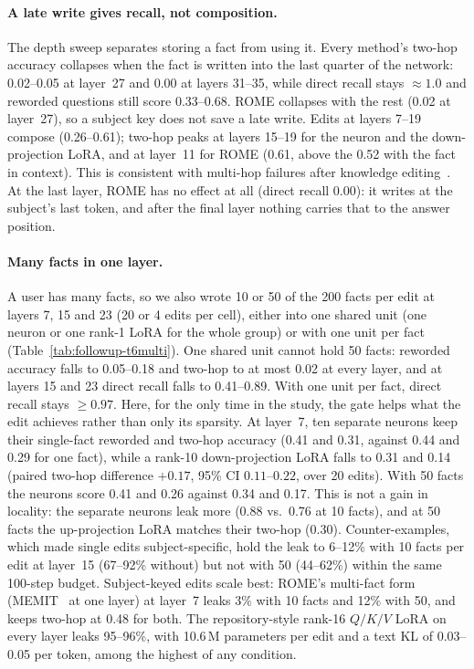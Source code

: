 \documentclass[11pt]{article}
\begin{document}
\paragraph{A late write gives recall, not composition.} The depth
sweep separates storing a fact from using it. Every method's two-hop
accuracy collapses when the fact is written into the last quarter of
the network: 0.02--0.05 at layer~27 and 0.00 at layers 31--35, while
direct recall stays $\approx1.0$ and reworded questions still score
0.33--0.68. ROME collapses with the rest (0.02 at layer~27), so a
subject key does not save a late write. Edits at layers 7--19 compose
(0.26--0.61); two-hop peaks at layers 15--19 for the neuron and the
down-projection LoRA, and at layer~11 for ROME (0.61, above the 0.52
with the fact in context). This is consistent with multi-hop failures
after knowledge editing~\citep{mquake2023}. At the last layer, ROME
has no effect at all (direct recall 0.00): it writes at the subject's
last token, and after the final layer nothing carries that to the
answer position.

\paragraph{Many facts in one layer.} A user has many facts, so we
also wrote 10 or 50 of the 200 facts per edit at layers 7, 15 and 23
(20 or 4 edits per cell), either into one shared unit (one neuron or
one rank-1 LoRA for the whole group) or with one unit per fact
(Table~\ref{tab:followup-t6multi}). One shared unit cannot hold 50
facts: reworded accuracy falls to 0.05--0.18 and two-hop to at most
0.02 at every layer, and at layers 15 and 23 direct recall falls to
0.41--0.89. With one unit per fact, direct recall stays $\geq0.97$.
Here, for the only time in the study, the gate helps what the edit
achieves rather than only its sparsity. At layer~7, ten separate
neurons keep their single-fact reworded and two-hop accuracy (0.41
and 0.31, against 0.44 and 0.29 for one fact), while a rank-10
down-projection LoRA falls to 0.31 and 0.14 (paired two-hop difference
$+0.17$, 95\% CI $0.11$--$0.22$, over 20 edits). With 50 facts the
neurons score 0.41 and 0.26 against 0.34 and 0.17. This is not a gain
in locality: the separate neurons leak more (0.88 vs.\ 0.76 at 10
facts), and at 50 facts the up-projection LoRA matches their two-hop
(0.30). Counter-examples, which made single edits subject-specific,
hold the leak to 6--12\% with 10 facts per edit at layer~15 (67--92\%
without) but not with 50 (44--62\%) within the same 100-step budget.
Subject-keyed edits scale best: ROME's multi-fact form
(MEMIT~\citep{meng2023memit} at one layer) at layer~7 leaks 3\% with
10 facts and 12\% with 50, and keeps two-hop at 0.48 for both. The
repository-style rank-16 $Q/K/V$ LoRA on every layer leaks 95--96\%,
with 10.6\,M parameters per edit and a text KL of 0.03--0.05 per
token, among the highest of any condition.
\end{document}
